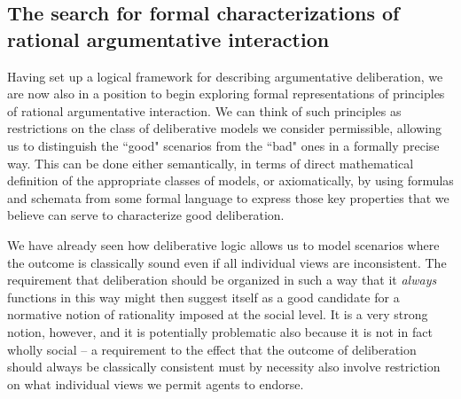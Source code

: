 \documentclass[greybox]{svmult}
\begin{document}
\subsection{The search for formal characterizations of rational argumentative interaction}\label{sub:for}

Having set up a logical framework for describing argumentative deliberation, we are now also in a position to begin exploring formal representations of principles of rational argumentative interaction. We can think of such principles as restrictions on the class of deliberative models we consider permissible, allowing us to distinguish the ``good" scenarios from the ``bad" ones in a formally precise way. This can be done either semantically, in terms of direct mathematical definition of the appropriate classes of models, or axiomatically, by using formulas and schemata from some formal language to express those key properties that we believe can serve to characterize good deliberation.

We have already seen how deliberative logic allows us to model scenarios where the outcome is classically sound even if all individual views are inconsistent. The requirement that deliberation should be organized in such a way that it \emph{always} functions in this way might then suggest itself as a good candidate for a normative notion of rationality imposed at the social level. It is a very strong notion, however, and it is potentially problematic also because it is not in fact wholly social -- a requirement to the effect that the outcome of deliberation should always be classically consistent must by necessity also involve restriction on what individual views we permit agents to endorse. 
\end{document}
